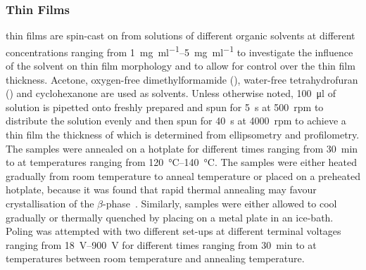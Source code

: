 \subsubsection{\pvtr{} Thin Films}
\pvdf{} thin films are spin-cast on \sih{} from solutions of different organic solvents at different concentrations ranging from \SIrange{1}{5}{\milli\gram\per\milli\litre} to investigate the influence of the solvent on thin film morphology and to allow for control over the thin film thickness. Acetone, oxygen-free dimethylformamide (\dmf{}), water-free tetrahydrofuran (\thf{}) and cyclohexanone are used as solvents. Unless otherwise noted, \SI{100}{\micro\litre} of \pvdf{} solution is pipetted onto freshly prepared \sih{} and spun for \SI{5}{\second} at \SI{500}{rpm} to distribute the solution evenly and then spun for \SI{40}{\second} at \SI{4000}{rpm} to achieve a thin film the thickness of which is determined from ellipsometry and profilometry.\\
The samples were annealed on a hotplate for different times ranging from \SI{30}{\minute} to  at temperatures ranging from \SIrange{120}{140}{\degreeCelsius}. The samples were either heated gradually from room temperature to anneal temperature or placed on a preheated hotplate, because it was found that rapid thermal annealing may favour crystallisation of the $\beta$-phase~\cite{kang_annealspeed}. Similarly, samples were either allowed to cool gradually or thermally quenched by placing on a metal plate in an ice-bath. Poling was attempted with two different set-ups at different terminal voltages ranging from \SIrange{18}{900}{\volt} for different times ranging from \SI{30}{\minute} to  at temperatures between room temperature and annealing temperature.\\
